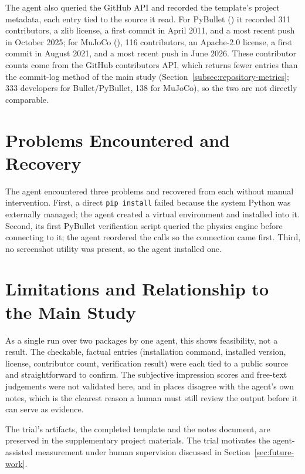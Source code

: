 The agent also queried the GitHub API and recorded the template's project
metadata, each entry tied to the source it read. For PyBullet
() it recorded 311 contributors, a zlib license, a
first commit in April 2011, and a most recent push in October 2025; for MuJoCo
(), 116 contributors, an Apache-2.0 license, a
first commit in August 2021, and a most recent push in June 2026. These
contributor counts come from the GitHub contributors API, which returns fewer
entries than the commit-log method of the main study
(Section~\ref{subsec:repository-metrics}; 333 developers for Bullet/PyBullet,
138 for MuJoCo), so the two are not directly comparable.

\section*{Problems Encountered and Recovery}

The agent encountered three problems and recovered from each without manual
intervention. First, a direct \texttt{pip install} failed because the system
Python was externally managed; the agent created a virtual environment and
installed into it. Second, its first PyBullet verification script queried the
physics engine before connecting to it; the agent reordered the calls so the
connection came first. Third, no screenshot utility was present, so the agent
installed one.

\section*{Limitations and Relationship to the Main Study}

As a single run over two packages by one agent, this shows feasibility, not a
result. The checkable, factual entries (installation command, installed version,
license, contributor count, verification result) were each tied to a public
source and straightforward to confirm. The subjective impression scores and
free-text judgements were not validated here, and in places disagree with the
agent's own notes, which is the clearest reason a human must still review the
output before it can serve as evidence.

The trial's artifacts, the completed template and the notes document, are
preserved in the supplementary project materials. The trial motivates the
agent-assisted measurement under human supervision discussed in
Section~\ref{sec:future-work}.
